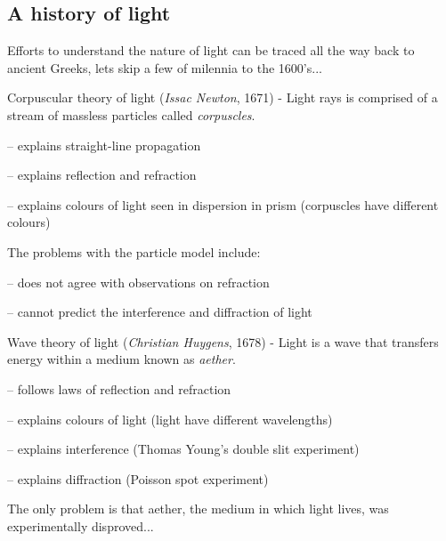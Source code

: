 \subsection{A history of light}

Efforts to understand the nature of light can be traced all the way back to ancient Greeks, lets skip a few of milennia to the 1600's...

Corpuscular theory of light (\emph{Issac Newton}, 1671) - Light rays is comprised of a stream of massless particles called \emph{corpuscles}.

\begin{compactitem}
	\item[--] explains straight-line propagation
	
	\item[--] explains reflection and refraction
	
	\item[--] explains colours of light seen in dispersion in prism (corpuscles have different colours)
\end{compactitem}

The problems with the particle model include:

\begin{compactitem}
	\item[--] does not agree with observations on refraction
	
	\item[--] cannot predict the interference and diffraction of light
\end{compactitem}

Wave theory of light (\emph{Christian Huygens}, 1678) - Light is a wave that transfers energy within a medium known as \emph{aether}.

\begin{compactitem}
	\item[--] follows laws of reflection and refraction
	
	\item[--] explains colours of light (light have different wavelengths)
	
	\item[--] explains interference (Thomas Young's double slit experiment)
	
	\item[--] explains diffraction (Poisson spot experiment)
\end{compactitem}

The only problem is that aether, the medium in which light lives, was experimentally disproved...

